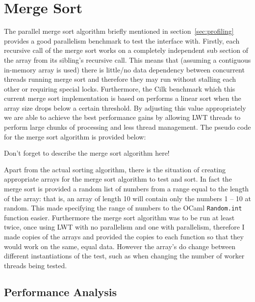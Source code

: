 \documentclass[12pt,twoside,notitlepage]{report}
\begin{document}
\section{Merge Sort}
\label{sec:merge_sort}
The parallel merge sort algorithm briefly mentioned in section~\ref{sec:profiling} provides a good parallelism benchmark to test the interface with. Firstly, each recursive call of the merge sort works on a completely independent sub
section of the array from its sibling's recursive call. This means that (assuming a contiguous in-memory array is used) there is little/no data dependency between concurrent threads running merge sort
and therefore they may run without stalling each other or requiring special locks. Furthermore, the Cilk benchmark which this current merge sort implementation is based on performs a linear sort when the array size drops below a
certain threshold. By adjusting this value appropriately we are able to achieve the best performance gains by allowing LWT threads to perform large chunks of processing and less thread management. The pseudo code for the merge sort
algorithm is provided below:

Don't forget to describe the merge sort algorithm here!

Apart from the actual sorting algorithm, there is the situation of creating appropriate arrays for the merge sort algorithm to test and sort. In fact the merge sort is provided a random list of numbers from a range equal to the length
of the array: that is, an array of length 10 will contain only the numbers 1 -- 10 at random. This made specifying the range of numbers to the OCaml {\tt Random.int} function easier. Furthermore the merge sort algorithm was to
be run at least twice, once using LWT with no parallelism and one with parallelism, therefore I made copies of the arrays and provided the copies to each function so that they would work on the same, equal data. However the array's
do change between different instantiations of the test, such as when changing the number of worker threads being tested.

\subsection{Performance Analysis}
\end{document}

